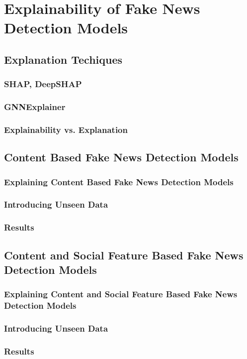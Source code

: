 
\chapter{Explainability of Fake News Detection Models}\label{chapter:explainability_of_fnd_models}

\section{Explanation Techiques}

\subsection{SHAP, DeepSHAP}

\subsection{GNNExplainer}

\subsection{Explainability vs. Explanation}

\section{Content Based Fake News Detection Models}

\subsection{Explaining Content Based Fake News Detection Models}

\subsection{Introducing Unseen Data}

\subsection{Results}

\section{Content and Social Feature Based Fake News Detection Models}

\subsection{Explaining Content and Social Feature Based Fake News Detection Models}

\subsection{Introducing Unseen Data}

\subsection{Results}